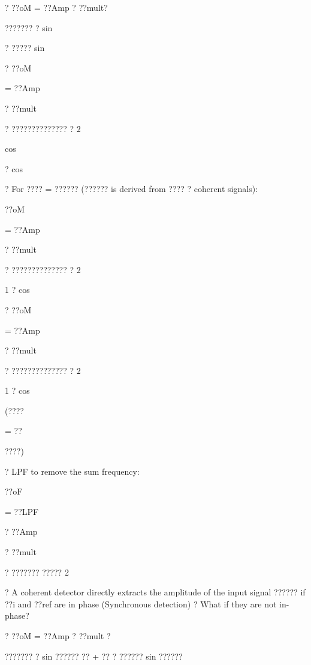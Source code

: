 \documentclass[2pt,landscape]{article}
\begin{document}
\begin{multicols*}{5}
?	??oM  = ??Amp ? ??mult?


???????  ? sin


? ?????  sin





?	??oM


= ??Amp


? ??mult


? ??????????????  ?
2


cos


? cos


?	For ???? = ?????? (?????? is derived from ???? ? coherent signals):



??oM


= ??Amp


? ??mult


? ??????????????  ?
2


1 ? cos









?	??oM


= ??Amp


? ??mult


? ??????????????  ?
2


1 ? cos


(????


= ??


????)


?	LPF to remove the sum frequency:


??oF


= ??LPF


? ??Amp


? ??mult


? ??????? ?????
2


?	A coherent detector directly extracts the amplitude of the input signal ??????
if ??i and ??ref are in phase (Synchronous detection)
?	What if they are not in-phase?

















?	??oM = ??Amp ? ??mult ?


???????  ? sin  ?????? ?? + ??	? ?????? sin  
??????



\end{multicols*}
\end{document}
